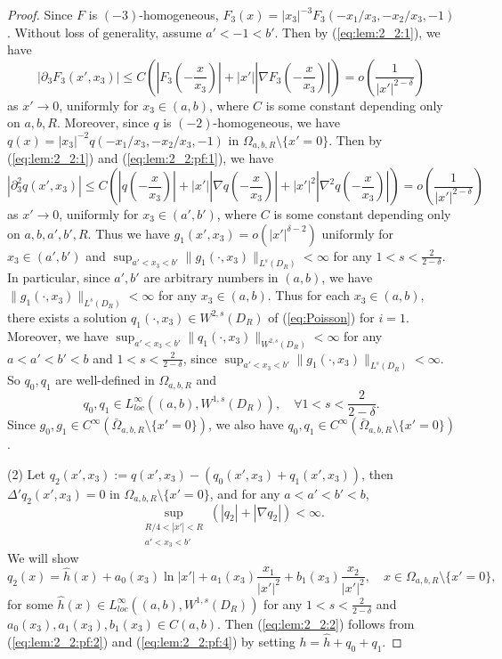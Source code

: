 \documentclass[12pt]{article}
\begin{document}
\begin{proof}
	Since $F$ is $(-3)$-homogeneous, $F_3(x)=|x_3|^{-3}F_3(-x_1/x_3, -x_2/x_3, -1)$. Without loss of generality, assume $a'<-1<b'$. 
	Then by (\ref{eq:lem:2_2:1}), we have
	\[
		|\partial_3F_3(x', x_3)|
		\le C(|F_3(-\frac{x}{x_3})|+ |x'| |\nabla F_3(-\frac{x}{x_3})|)=o\left(\frac{1}{|x'|^{2-\delta}}\right) 
	\]
	as $x'\to 0$, uniformly for $x_3\in (a, b)$, 
	where $C$ is some constant depending only on $a, b, R$. 
Moreover, since $q$ is $(-2)$-homogeneous, we have $q(x)=|x_3|^{-2}q(-x_1/x_3, -x_2/x_3, -1)$ in $\Omega_{a, b, R}\setminus\{x'=0\}$. 
	Then by (\ref{eq:lem:2_2:1}) and (\ref{eq:lem:2_2:pf:1}), we have
	\[
		|\partial_3^2q(x', x_3)|
		\le C(|q(-\frac{x}{x_3})|+|x'| |\nabla q(-\frac{x}{x_3})|+|x'|^2|\nabla^2 q(-\frac{x}{x_3})|)=o\left(\frac{1}{|x'|^{2-\delta}}\right)
			\]
	as $x'\to 0$, uniformly for $x_3\in (a', b')$, where $C$ is some constant depending only on $a, b, a', b', R$. 
	Thus we have $g_1(x', x_3)=o\left(|x'|^{\delta-2}\right)$ uniformly for $x_3\in (a', b')$ and 	 $\sup_{a'<x_3<b'}\|g_1(\cdot, x_3)\|_{L^s(D_R)}<\infty$ for any $1< s<\frac{2}{2-\delta}$. 
	In particular, since $a', b'$ are arbitrary numbers in $(a,b)$, we have $\|g_1(\cdot, x_3)\|_{L^s(D_R)}<\infty$ for any $x_3\in (a, b)$. Thus for each $x_3\in (a, b)$, there exists a solution $q_1(\cdot,x_3)\in W^{2,s}(D_R)$ of (\ref{eq:Poisson}) for $i=1$. Moreover, we have $\sup_{a'<x_3<b'} \| q_1(\cdot, x_3) \|_{W^{2,s}(D_{R})} < \infty$ for any $a<a'<b'<b$ and $1< s<\frac{2}{2-\delta}$, since $\sup_{a'<x_3<b'}\|g_1(\cdot, x_3)\|_{L^s(D_R)}<\infty$. So $q_0, q_1$ are well-defined in $\Omega_{a, b, R}$ and 
	\begin{equation}\label{eq:lem:2_2:pf:2}
		q_0, q_1 \in L^{\infty}_{loc}((a, b), W^{1, s}(D_R)), \quad \forall 1<s<\frac{2}{2-\delta}.
	\end{equation} 
	Since $g_0, g_1\in C^{\infty}(\bar{\Omega}_{a, b, R}\setminus\{x'=0\})$, we also have 
	$q_0, q_1\in C^{\infty}(\bar{\Omega}_{a, b, R}\setminus\{x'=0\})$. 	

	(2) Let $q_2(x',x_3):=q(x',x_3)-(q_0(x', x_3)+q_1(x', x_3))$, then $\Delta' q_2(x', x_3)=0$ in $\Omega_{a, b, R}\setminus\{x'=0\}$, and for any $a<a'<b'<b$, 
	\begin{equation}\label{eq:lem:2_2:pf:3}
		\sup\limits_{\substack{R/4<|x'|<R \\ a'<x_3<b'}}(|q_2|+|\nabla q_2|)<\infty. 
	\end{equation}
	We will show 
	\begin{equation}\label{eq:lem:2_2:pf:4}
		q_2(x)=\hat{h}(x)+a_0(x_3)\ln |x'|+a_1(x_3)\frac{x_1}{|x'|^2}+b_1(x_3)\frac{x_2}{|x'|^2}, \quad x\in \Omega_{a, b, R}\setminus\{x'=0\},
	\end{equation}
	for some $\hat{h}(x) \in L^{\infty}_{loc}((a, b), W^{1, s}(D_R))$ for any $1< s<\frac{2}{2-\delta}$ and $a_0(x_3), a_1(x_3), b_1(x_3)\in C(a, b)$. Then (\ref{eq:lem:2_2:2}) follows from (\ref{eq:lem:2_2:pf:2}) and (\ref{eq:lem:2_2:pf:4}) by setting $h=\hat{h}+q_0+q_1$. 
	

\end{proof}
\end{document}
